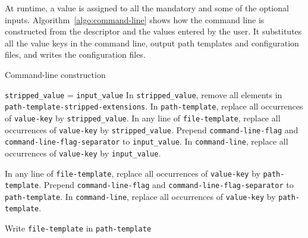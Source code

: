 \documentclass[a4paper,num-refs]{oup-contemporary}
\begin{document}
At runtime, a value is assigned to all the mandatory and some of the
optional inputs. %
Algorithm~\ref{algo:command-line} shows how the command line is
constructed from the descriptor and the values entered by the user. It
substitutes all the value keys in the command line, output path
templates and configuration files, and writes the configuration files.
\begin{algorithm}[h!]
\caption{Command-line construction}
\label{algo:command-line}
\begin{algorithmic}
  \State {}
  \State \texttt{stripped\_value} = \texttt{input\_value}
  \State In \texttt{stripped\_value}, remove  all elements in \texttt{path-template-stripped-extensions}.
  \EndIf
  \State In \texttt{path-template}, replace all occurrences of \texttt{value-key} by \texttt{stripped\_value}.
  \State In any line of \texttt{file-template}, replace all occurrences of \texttt{value-key} by \texttt{stripped\_value}.
  \EndIf
  \EndFor
  \State Prepend \texttt{command-line-flag} and \texttt{command-line-flag-separator} to \texttt{input\_value}.
  \State In \texttt{command-line}, replace all occurrences of \texttt{value-key} by \texttt{input\_value}.
  \EndIf
  \EndFor

  \State {}
  \State In any line of \texttt{file-template}, replace all occurrences of \texttt{value-key} by \texttt{path-template}.
  \State {}
  \EndIf
  \EndFor
  \State Prepend \texttt{command-line-flag} and \texttt{command-line-flag-separator} to \texttt{path-template}.
  \State In \texttt{command-line}, replace all occurrences of \texttt{value-key} by \texttt{path-template}.
  \EndIf
  \EndFor

  \State {}
  \State Write \texttt{file-template} in \texttt{path-template}
  \State {}
  \EndIf
  \EndFor

\end{algorithmic}
\end{algorithm}
\end{document}
